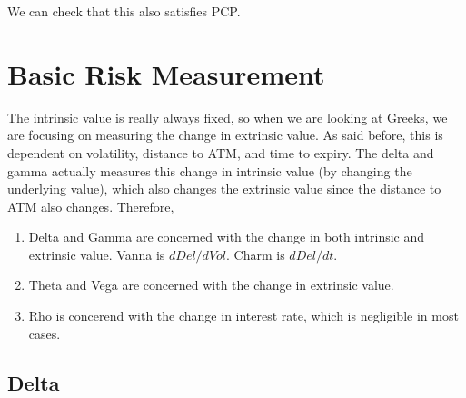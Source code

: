 \documentclass{article}
\begin{document}
    We can check that this also satisfies PCP. 

\section{Basic Risk Measurement}

    The intrinsic value is really always fixed, so when we are looking at Greeks, we are focusing on measuring the change in extrinsic value. As said before, this is dependent on volatility, distance to ATM, and time to expiry. The delta and gamma actually measures this change in intrinsic value (by changing the underlying value), which also changes the extrinsic value since the distance to ATM also changes. Therefore,

    \begin{enumerate}
      \item Delta and Gamma are concerned with the change in both intrinsic and extrinsic value. Vanna is $d Del / d Vol$. Charm is $d Del / d t$.
      \item Theta and Vega are concerned with the change in extrinsic value.
      \item Rho is concerend with the change in interest rate, which is negligible in most cases.
    \end{enumerate}

  \subsection{Delta}
\end{document}
